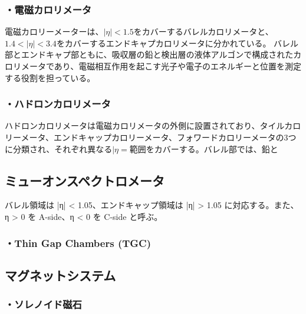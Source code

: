 \subsubsection{・電磁カロリメータ}
電磁カロリーメーターは、$|\eta|<1.5$をカバーするバレルカロリメータと、$1.4<|\eta|<3.4$をカバーするエンドキャプカロリメータに分かれている。
バレル部とエンドキャプ部ともに、吸収層の鉛と検出層の液体アルゴンで構成されたカロリメータであり、電磁相互作用を起こす光子や電子のエネルギーと位置を測定する役割を担っている。

\subsubsection{・ハドロンカロリメータ}
ハドロンカロリメータは電磁カロリメータの外側に設置されており、タイルカロリーメータ、エンドキャップカロリーメータ、フォワードカロリーメータの3つに分類され、それぞれ異なる$|\eta=$範囲をカバーする。バレル部では、鉛と

\subsection{ミューオンスペクトロメータ}
\label{section2-2-4}
バレル領域は |η| < 1.05、エンドキャップ領域は |η| > 1.05
に対応する。また、η > 0 を A-side、η < 0 を C-side と呼ぶ。


\subsubsection{・Thin Gap Chambers (TGC)}



\subsection{マグネットシステム}
\subsubsection{・ソレノイド磁石}




